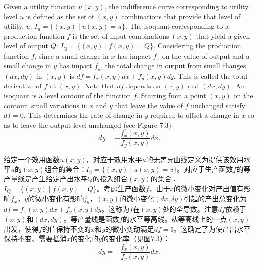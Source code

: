 \begin{original}
Given a utility function $u(x, y)$, the indifference curve corresponding to utility level $\bar{u}$ is defined as the set of $(x, y)$ combinations that provide that level of utility, $\bar{u}$: $I_{\bar{u}} = \{(x, y) \mid u(x, y) = \bar{u}\}$. The isoquant corresponding to a production function $f$ is the set of input combinations $(x, y)$ that yield a given level of output $Q$: $I_Q = \{(x, y) \mid f(x, y) = Q\}$. Considering the production function $f$, since a small change in $x$ has impact $f_x$ on the value of output and a small change in $y$ has impact $f_y$, the total change in output from small changes $(dx, dy)$ in $(x, y)$ is $df = f_x(x, y) dx + f_y(x, y) dy$. This is called the total derivative of $f$ at $(x, y)$. Note that $df$ depends on $(x, y)$ and $(dx, dy)$. An isoquant is a level contour of the function $f$. Starting from a point $(x, y)$ on the contour, small variations in $x$ and $y$ that leave the value of $f$ unchanged satisfy $df = 0$. This determines the rate of change in $y$ required to offset a change in $x$ so as to leave the output level unchanged (see Figure 7.3):
\[
dy = -\frac{f_x(x, y)}{f_y(x, y)} dx.
\]
\end{original}
\begin{translation}
给定一个效用函数$u(x, y)$，对应于效用水平$\bar{u}$的无差异曲线定义为提供该效用水平$\bar{u}$的$(x, y)$组合的集合：$I_{\bar{u}} = \{(x, y) \mid u(x, y) = \bar{u}\}$。对应于生产函数$f$的等产量线是产生给定产出水平$Q$的投入组合$(x, y)$的集合：$I_Q = \{(x, y) \mid f(x, y) = Q\}$。考虑生产函数$f$，由于$x$的微小变化对产出值有影响$f_x$，$y$的微小变化有影响$f_y$，$(x, y)$的微小变化$(dx, dy)$引起的产出总变化为$df = f_x(x, y) dx + f_y(x, y) dy$。这称为$f$在$(x, y)$处的全导数。注意$df$依赖于$(x, y)$和$(dx, dy)$。等产量线是函数$f$的水平等高线。从等高线上的一点$(x, y)$出发，使得$f$的值保持不变的$x$和$y$的微小变动满足$df = 0$。这确定了为使产出水平保持不变、需要抵消$x$的变化的$y$的变化率（见图7.3）：
\[
dy = -\frac{f_x(x, y)}{f_y(x, y)} dx.
\]
\end{translation}

